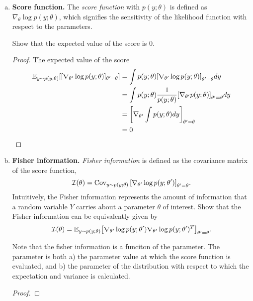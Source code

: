 \documentclass[12pt,letterpaper,boxed]{hmcpset}
\begin{document}
\begin{solution}
\begin{enumerate}[(a)]
  \item \textbf{Score function.} The \emph{score function} with $p(y; \theta)$ is defined as $\nabla_\theta \log p(y; \theta)$, which signifies the sensitivity of the likelihood function with respect to the parameters.
  
  Show that the expected value of the score is 0.

  \begin{proof}
    The expected value of the score
    \[
    \begin{aligned}
      \mathbb{E}_{y \sim p(y; \theta)}[[\nabla_{\theta'} \log p(y; \theta)]_{\theta' = \theta}] &= \int p(y; \theta) \qty[\nabla_{\theta'} \log p(y; \theta)]_{\theta' = \theta} dy \\
      &= \int p(y; \theta) \frac{1}{p(y; \theta) } \qty[\nabla_{\theta'} p(y; \theta)]_{\theta' = \theta}dy \\
      &= \qty[\nabla_{\theta'} \int p(y; \theta) dy]_{\theta' = \theta}\\
      &= 0
    \end{aligned}
    \]
  \end{proof}

  \item \textbf{Fisher information.} \emph{Fisher information} is defined as the covariance matrix of the score function,
  \[
  \mathcal{I}(\theta) = \operatorname{Cov}_{y \sim p(y; \theta)} \qty[\nabla_{\theta'} \log p(y; \theta') ]_{\theta' = \theta}.
  \]
  Intuitively, the Fisher information represents the amount of information that a random variable $Y$ carries about a parameter $\theta$ of interest. Show that the Fisher information can be equivalently given by
  \[
  \mathcal{I}(\theta) = \mathbb{E}_{y \sim p(y; \theta)} \qty[\nabla_{\theta'} \log p(y; \theta') \nabla_{\theta'} \log p(y; \theta')^T ]_{\theta' = \theta}.
  \]

  Note that the fisher information is a funciton of the parameter. The parameter is both a) the parameter value at which the score function is evaluated, and b) the parameter of the distribution with respect to which the expectation and variance is calculated.

  \begin{proof}
    
  \end{proof}
\end{enumerate}
\end{solution}
\end{document}
